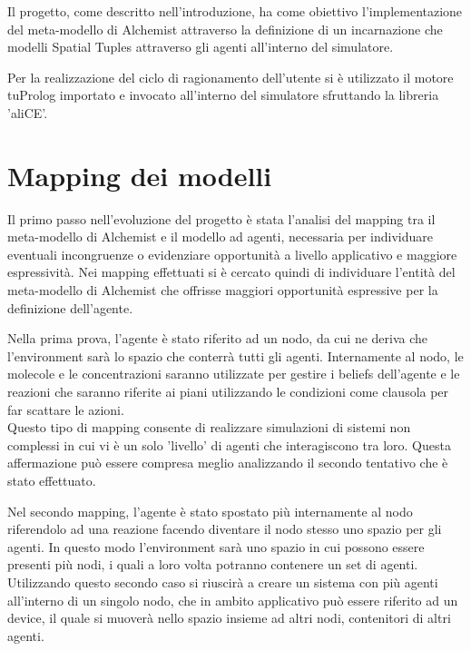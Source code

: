 \documentclass[12pt,a4paper,openright,twoside]{report}
\begin{document}
Il progetto, come descritto nell'introduzione, ha come obiettivo l'implementazione del meta-modello di Alchemist attraverso la definizione di un incarnazione che modelli Spatial Tuples attraverso gli agenti all'interno del simulatore.

Per la realizzazione del ciclo di ragionamento dell'utente si \`e utilizzato il motore tuProlog importato e invocato all'interno del simulatore sfruttando la libreria 'aliCE'.

\section{Mapping dei modelli}
Il primo passo nell'evoluzione del progetto \`e stata l'analisi del mapping tra il meta-modello di Alchemist e il modello ad agenti, necessaria per individuare eventuali incongruenze o evidenziare opportunit\`a a livello applicativo e maggiore espressivit\`a.
Nei mapping effettuati si \`e cercato quindi di individuare l'entit\`a del meta-modello di Alchemist che offrisse maggiori opportunit\`a espressive per la definizione dell'agente.

Nella prima prova, l'agente \`e stato riferito ad un nodo, da cui ne deriva che l'environment sar\`a lo spazio che conterr\`a tutti gli agenti. Internamente al nodo, le molecole e le concentrazioni saranno utilizzate per gestire i beliefs dell'agente e le reazioni che saranno riferite ai piani utilizzando le condizioni come clausola per far scattare le azioni.
\\
Questo tipo di mapping consente di realizzare simulazioni di sistemi non complessi in cui vi \`e un solo 'livello' di agenti che interagiscono tra loro. Questa affermazione pu\`o essere compresa meglio analizzando il secondo tentativo che \`e stato effettuato.

Nel secondo mapping, l'agente \`e stato spostato pi\`u internamente al nodo riferendolo ad una reazione facendo diventare il nodo stesso uno spazio per gli agenti. In questo modo l'environment sar\`a uno spazio in cui possono essere presenti pi\`u nodi, i quali a loro volta potranno contenere un set di agenti.
\\
Utilizzando questo secondo caso si riuscir\`a a creare un sistema con pi\`u agenti all'interno di un singolo nodo, che in ambito applicativo pu\`o essere riferito ad un device, il quale si muover\`a nello spazio insieme ad altri nodi, contenitori di altri agenti.
\end{document}
